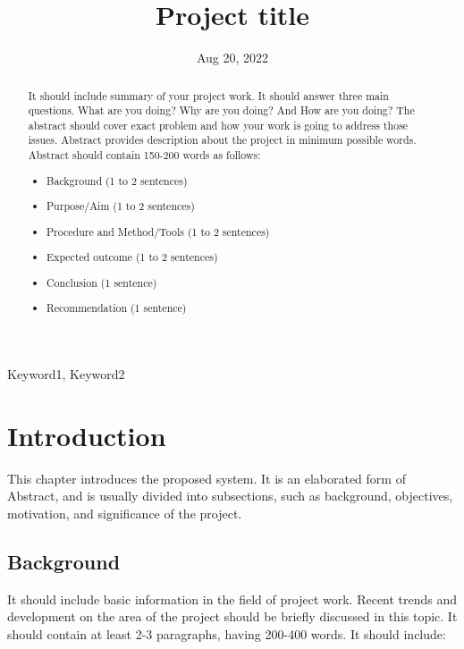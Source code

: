 \documentclass{projectreport}
\title{Project title}
\date{Aug 20, 2022}
\begin{document}
	\maketitle
	
	\begin{abstract}
		It should include summary of your project work. It should answer three main questions. What are you doing? Why are you doing? And How are you doing? The abstract should cover exact problem and how your work is going to address those issues. Abstract provides description about the project in minimum possible words. Abstract should contain 150-200 words as follows:
		
		\begin{itemize}
			\item Background (1 to 2 sentences)
			\item Purpose/Aim (1 to 2 sentences)
			\item Procedure and Method/Tools (1 to 2 sentences)
			\item Expected outcome (1 to 2 sentences)
			\item Conclusion (1 sentence)
			\item Recommendation (1 sentence)
		\end{itemize}
		
	\end{abstract}

	\begin{keywords}
		Keyword1, Keyword2
	\end{keywords}

	\setcounter{page}{1}
		
	\tableofcontents
	\listoffigures
	\listoftables
	
	\clearpage
	\printnoidxglossary[ title=Abbreviations]
	
	
	\chapter{Introduction}
	\setcounter{page}{1}
	This chapter introduces the proposed system. It is an elaborated form of Abstract, and is usually divided into subsections, such as background, objectives, motivation, and significance of the project.
	
	\section{Background}
	It should include basic information in the field of project work. Recent trends and development on the area of the project should be briefly discussed in this topic. It should contain at least 2-3 paragraphs, having 200-400 words.
	It should include:
	
\end{document}
